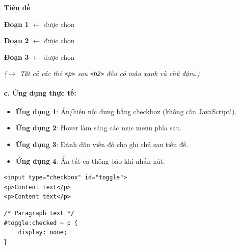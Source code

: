 \documentclass[11pt,oneside]{book}
\newcommand{\codeinline}[1]{\textcolor{accentOrange}{\texttt{#1}}}
\begin{document}
\begin{browserWindow}
\sffamily\small
{\bfseries\Large\textcolor{darkText}{Tiêu đề}} \par\vspace{4pt}
\textcolor{primaryBlue}{\textbf{Đoạn 1}} {\small\textcolor{gray!60}{$\leftarrow$ được chọn}} \par\vspace{2pt}
\textcolor{primaryBlue}{\textbf{Đoạn 2}} {\small\textcolor{gray!60}{$\leftarrow$ được chọn}} \par\vspace{2pt}
\textcolor{primaryBlue}{\textbf{Đoạn 3}} {\small\textcolor{gray!60}{$\leftarrow$ được chọn}} \par\vspace{4pt}
\textcolor{gray!70}{\small\textit{($\rightarrow$ Tất cả các thẻ \codeinline{<p>} sau \codeinline{<h2>} đều có màu xanh và chữ đậm.)}}
\end{browserWindow}

\paragraph{c. Ứng dụng thực tế:}

\begin{tipBox}
\begin{itemize}[leftmargin=1.5em, itemsep=3pt, parsep=0pt]
    \item \textbf{Ứng dụng 1}: Ẩn/hiện nội dung bằng checkbox (không cần JavaScript!).
    \item \textbf{Ứng dụng 2}: Hover làm sáng các mục menu phía sau.
    \item \textbf{Ứng dụng 3}: Đánh dấu viền đỏ cho ghi chú sau tiêu đề.
    \item \textbf{Ứng dụng 4}: Ẩn tất cả thông báo khi nhấn nút.
\end{itemize}
\end{tipBox}

\begin{codeWindow}
\begin{lstlisting}[language=HTML5]
<input type="checkbox" id="toggle">
<p>Content text</p>
<p>Content text</p>
\end{lstlisting}

\begin{lstlisting}[language=CSS3]
/* Paragraph text */
#toggle:checked ~ p {
    display: none;
}
\end{lstlisting}
\end{codeWindow}
\end{document}
